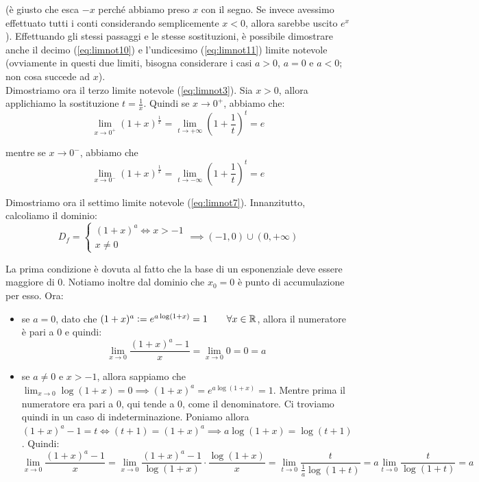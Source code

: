 \documentclass{article}
\begin{document}
\noindent (è giusto che esca $-x$ perché abbiamo preso $x$ con il segno. Se invece avessimo effettuato tutti i conti considerando semplicemente $x < 0$, allora sarebbe uscito $e^x$). Effettuando gli stessi passaggi e le stesse sostituzioni, è possibile dimostrare anche il decimo (\ref{eq:limnot10}) e l'undicesimo (\ref{eq:limnot11}) limite notevole (ovviamente in questi due limiti, bisogna considerare i casi $a > 0$, $a = 0$ e $a < 0$; non cosa succede ad $x$).\\

\noindent Dimostriamo ora il terzo limite notevole (\ref{eq:limnot3}). Sia $x > 0$, allora applichiamo la sostituzione $t = \frac{1}{x}$. Quindi se $x \to 0^+$, abbiamo che:
\begin{equation*}
    \lim_{x \to 0^+} (1 + x)^\frac{1}{x} = \lim_{t \to +\infty} \left(1 + \frac{1}{t}\right)^t = e
\end{equation*}

\noindent mentre se $x \to 0^-$, abbiamo che
\begin{equation*}
    \lim_{x \to 0^-} (1 + x)^\frac{1}{x} = \lim_{t \to -\infty} \left(1 + \frac{1}{t}\right)^t = e
\end{equation*}

\noindent Dimostriamo ora il settimo limite notevole (\ref{eq:limnot7}). Innanzitutto, calcoliamo il dominio: 
\begin{equation*}
    D_f = 
    \begin{cases}
        (1 + x)^a \iff x > -1 \\
        x \neq 0
    \end{cases}
    \implies (-1, 0) \cup (0, +\infty)
\end{equation*}

\noindent La prima condizione è dovuta al fatto che la base di un esponenziale deve essere maggiore di $0$. Notiamo inoltre dal dominio che $x_0 = 0$ è punto di accumulazione per esso. Ora:
\begin{itemize}
    \item se $a = 0$, dato che $(1 + x)^a \vcentcolon = e^{a\log(1 + x)} = 1 \qquad \forall x \in \mathbb{R}$, allora il numeratore è pari a $0$ e quindi: $$\lim_{x \to 0} \frac{(1 + x)^a - 1}{x} = \lim_{x \to 0} 0 = 0 = a$$
    \item se $a \neq 0$ e $x > -1$, allora sappiamo che $\lim_{x \to 0} \log(1 + x) = 0 \implies (1 + x)^a = e^{a\log(1 + x)} = 1$. Mentre prima il numeratore era pari a $0$, qui tende a $0$, come il denominatore. Ci troviamo quindi in un caso di indeterminazione. Poniamo allora $(1 + x)^a - 1 = t \iff (t + 1) = (1 + x)^a \implies a\log(1 + x) = \log(t + 1)$. Quindi: $$\lim_{x \to 0} \frac{(1 + x)^a - 1}{x} = \lim_{x \to 0} \frac{(1 + x)^a - 1}{\log(1 + x)} \cdot \frac{\log(1 + x)}{x} = \lim_{t \to 0} \frac{t}{\frac{1}{a} \log(1 + t)} = a\lim_{t \to 0}\frac{t}{\log(1 + t)} = a$$
\end{itemize}
\end{document}
